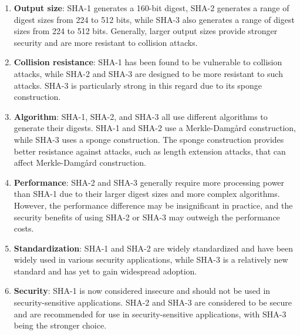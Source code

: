 \documentclass[11pt]{article}
\begin{document}
\begin{enumerate}
\begin{enumerate}
          \end{enumerate}

          \begin{enumerate}
              \item \textbf{Output size}: SHA-1 generates a 160-bit digest, SHA-2 generates a range of digest sizes from 224 to 512 bits, while SHA-3 also generates a range of digest sizes from 224 to 512 bits. Generally, larger output sizes provide stronger security and are more resistant to collision attacks.

              \item \textbf{Collision resistance}: SHA-1 has been found to be vulnerable to collision attacks, while SHA-2 and SHA-3 are designed to be more resistant to such attacks. SHA-3 is particularly strong in this regard due to its sponge construction.

              \item \textbf{Algorithm}: SHA-1, SHA-2, and SHA-3 all use different algorithms to generate their digests. SHA-1 and SHA-2 use a Merkle-Damgård construction, while SHA-3 uses a sponge construction. The sponge construction provides better resistance against attacks, such as length extension attacks, that can affect Merkle-Damgård construction.

              \item \textbf{Performance}: SHA-2 and SHA-3 generally require more processing power than SHA-1 due to their larger digest sizes and more complex algorithms. However, the performance difference may be insignificant in practice, and the security benefits of using SHA-2 or SHA-3 may outweigh the performance costs.

              \item \textbf{Standardization}: SHA-1 and SHA-2 are widely standardized and have been widely used in various security applications, while SHA-3 is a relatively new standard and has yet to gain widespread adoption.

              \item \textbf{Security}: SHA-1 is now considered insecure and should not be used in security-sensitive applications. SHA-2 and SHA-3 are considered to be secure and are recommended for use in security-sensitive applications, with SHA-3 being the stronger choice.
          \end{enumerate}


\end{enumerate}
\end{document}
